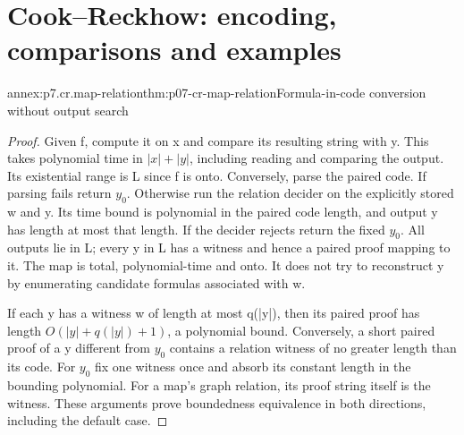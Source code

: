 \section{Cook--Reckhow: encoding, comparisons and examples}

\begin{annexitem}{annex:p7.cr.map-relation}{thm:p07-cr-map-relation}{Formula-in-code conversion without output search}
\begin{proof}
Given f, compute it on x and compare its resulting string with y.
This takes polynomial time in \(|x|+|y|\), including reading and
comparing the output. Its existential range is L since f is onto.
Conversely, parse the paired code. If parsing fails return \(y_0\).
Otherwise run the relation decider on the explicitly stored w and y.
Its time bound is polynomial in the paired code length, and output
y has length at most that length. If the decider rejects return
the fixed \(y_0\). All outputs lie in L; every y in L has a
witness and hence a paired proof mapping to it. The map is total,
polynomial-time and onto. It does not try to reconstruct y by
enumerating candidate formulas associated with w.

If each y has a witness w of length at most q(|y|), then its paired
proof has length \(O(|y|+q(|y|)+1)\), a polynomial bound.
Conversely, a short paired proof of a y different from \(y_0\)
contains a relation witness of no greater length than its code.
For \(y_0\) fix one witness once and absorb its constant length
in the bounding polynomial. For a map's graph relation, its proof
string itself is the witness. These arguments prove boundedness
equivalence in both directions, including the default case.
\end{proof}
\end{annexitem}

